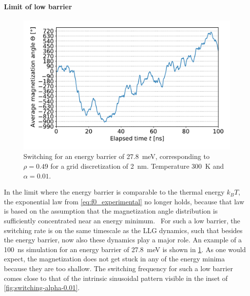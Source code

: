 \documentclass[11pt,a4paper,english]{article}
\begin{document}
\paragraph{Limit of low barrier}
\begin{figure}
    \centering
    \includegraphics[width=0.8\columnwidth]{Figures/biaxial_island/Switching/49x100_300K_alpha0.01_100ns_2nm.pdf}
    \caption{Switching for an energy barrier of \SI{27.8}{\milli\electronvolt}, corresponding to $\rho=0.49$ for a grid discretization of \SI{2}{\nano\metre}. Temperature \SI{300}{\kelvin} and $\alpha = 0.01$.}
    \label{fig:switching-49x100-300}
\end{figure}
In the limit where the energy barrier is comparable to the thermal energy $k_B T$, the exponential law from \cref{eq:f0_experimental} no longer holds, because that law is based on the assumption that the magnetization angle distribution is sufficiently concentrated near an energy minimum.~\cite{ThermFluc_SingleDomain}
For such a low barrier, the switching rate is on the same timescale as the LLG dynamics, such that besides the energy barrier, now also these dynamics play a major role. An example of a \SI{100}{\nano\second} simulation for an energy barrier of \SI{27.8}{\milli\electronvolt} is shown in \cref{fig:switching-49x100-300}. As one would expect, the magnetization does not get stuck in any of the energy minima because they are too shallow. The switching frequency for such a low barrier comes close to that of the intrinsic sinusoidal pattern visible in the inset of \cref{fig:switching-alpha-0.01}.


\clearpage
\end{document}
